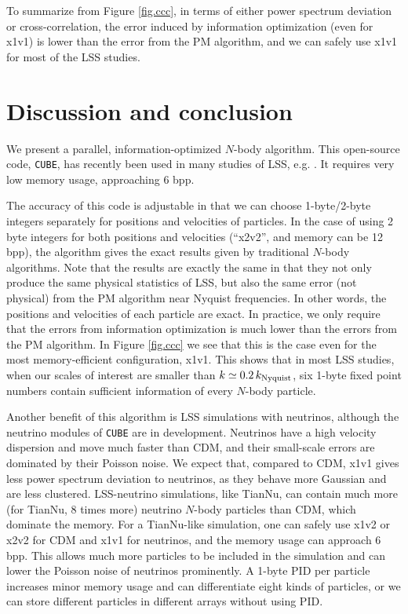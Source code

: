 \documentclass[10pt,twocolumn,preprint]{emulateapj}
\begin{document}
To summarize from Figure \ref{fig.ccc}, in terms of either power spectrum deviation or cross-correlation, the error induced by information optimization (even for x1v1) is lower than the error from the PM algorithm, and we can safely use x1v1 for most of the LSS studies.

\section{Discussion and conclusion}\label{s.discussion}
We present a parallel, information-optimized $N$-body algorithm. This open-source code, {\tt CUBE}, has recently been used in many studies of LSS, e.g. \cite{2017PhRvD..95d3501Y,2017ApJ...841L..29W,2017MNRAS.469.1968P}. It requires very low memory usage, approaching 6 bpp.

The accuracy of this code is adjustable in that we can choose 1-byte/2-byte integers separately for positions and velocities of particles. In the case of using 2 byte integers for both positions and velocities (``x2v2'', and memory can be 12 bpp), the algorithm gives the exact results given by traditional $N$-body algorithms. Note that the results are exactly the same in that they not only produce the same physical statistics of LSS, but also the same error (not physical) from the PM algorithm near Nyquist frequencies. In other words, the positions and velocities of each particle are exact. In practice, we only require that the errors from information optimization is much lower than the errors from the PM algorithm. In Figure \ref{fig.ccc} we see that this is the case even for the most memory-efficient configuration, x1v1. This shows that in most LSS studies, when our scales of interest are smaller than $k\simeq 0.2\,k_{\rm Nyquist}$, six 1-byte fixed point numbers contain sufficient information of every $N$-body particle.

Another benefit of this algorithm is LSS simulations with neutrinos, although the neutrino modules of {\tt CUBE} are in development. Neutrinos have a high velocity dispersion and move much faster than CDM, and their small-scale errors are dominated by their Poisson noise. We expect that, compared to CDM, x1v1 gives less power spectrum deviation to neutrinos, as they behave more Gaussian and are less clustered. LSS-neutrino simulations, like TianNu, can contain much more (for TianNu, 8 times more) neutrino $N$-body particles than CDM, which dominate the memory. For a TianNu-like simulation, one can safely use x1v2 or x2v2 for CDM and x1v1 for neutrinos, and the memory usage can approach 6 bpp. This allows much more particles to be included in the simulation and can lower the Poisson noise of neutrinos prominently. A 1-byte PID per particle increases minor memory usage and can differentiate eight kinds of particles, or we can store different particles in different arrays without using PID.
\end{document}
